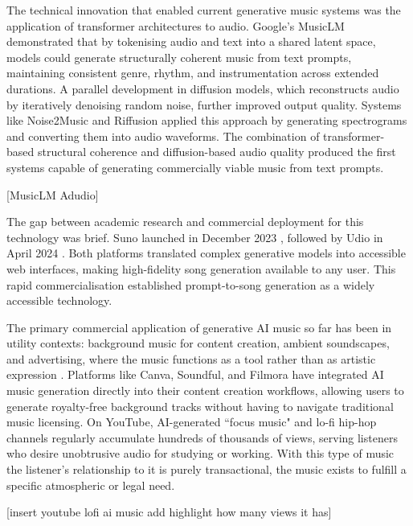 \documentclass{article}
\begin{document}
The technical innovation that enabled current generative music systems was the application of transformer architectures to audio. Google's MusicLM \cite{agostinelli2023musiclm} demonstrated that by tokenising audio and text into a shared latent space, models could generate structurally coherent music from text prompts, maintaining consistent genre, rhythm, and instrumentation across extended durations. A parallel development in diffusion models, which reconstructs audio by iteratively denoising random noise, further improved output quality. Systems like Noise2Music \cite{huang2023noise2music} and Riffusion \cite{coldewey2022riffusion} applied this approach by generating spectrograms and converting them into audio waveforms. The combination of transformer-based structural coherence and diffusion-based audio quality produced the first systems capable of generating commercially viable music from text prompts.

[MusicLM Adudio]

The gap between academic research and commercial deployment for this technology was brief. Suno launched in December 2023 \cite{sunoai}, followed by Udio in April 2024 \cite{udio}. Both platforms translated complex generative models into accessible web interfaces, making high-fidelity song generation available to any user. This rapid commercialisation established prompt-to-song generation as a widely accessible technology.

The primary commercial application of generative AI music so far has been in utility contexts: background music for content creation, ambient soundscapes, and advertising, where the music functions as a tool rather than as artistic expression \cite{stammer2024generative}. Platforms like Canva, Soundful, and Filmora have integrated AI music generation directly into their content creation workflows, allowing users to generate royalty-free background tracks without having to navigate traditional music licensing. On YouTube, AI-generated ``focus music" and lo-fi hip-hop channels regularly accumulate hundreds of thousands of views, serving listeners who desire unobtrusive audio for studying or working. With this type of music the listener's relationship to it is purely transactional, the music exists to fulfill a specific atmospheric or legal need.

[insert youtube lofi ai music add highlight how many views it has]
\end{document}
